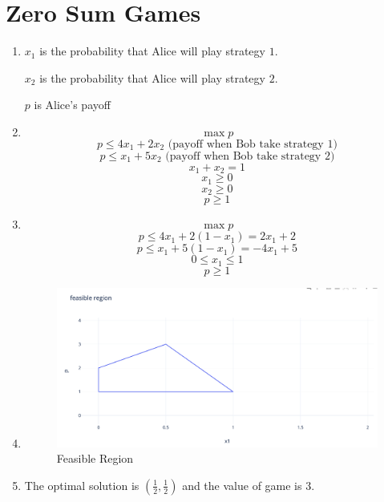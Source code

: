 \documentclass[11pt]{article}
\newenvironment{qparts}{\begin{enumerate}[{(}a{)}]}{\end{enumerate}}
\begin{document}
\newpage
\section{Zero Sum Games}
\begin{qparts}
	\item 
	
	$x_1$ is the probability that Alice will play strategy $1$. 
	
	$x_2$ is the probability that Alice will play strategy $2$.
	
	$p$ is Alice's payoff
	
	\item
	
	\[
		\max p
	\]
	\[
		p \le 4x_1 +2x_2 \text{ (payoff when Bob take strategy 1)}
	\]
	\[
		p \le x_1 +5x_2 \text{ (payoff when Bob take strategy 2)}
	\]
	\[
		x_1 + x_2 = 1
	\]
	\[
		x_1 \ge 0
	\]
	\[
		x_2 \ge 0
	\]
	\[
		p \ge 1
	\]
	
	\item
	
	\[
		\max p
	\]
	\[
		p \le 4x_1 +2(1 - x_1) = 2x_1 + 2
	\]
	\[
		p \le x_1 +5(1 - x_1) = -4x_1 + 5
	\]
	\[
		0 \le x_1 \le 1
	\]
	\[
		p \ge 1
	\]
	
	\item \text{ }
	
	\begin{figure}[h]
	\centering
	\includegraphics[width=.8\textwidth]{feasible_region.png}
	\caption{\label{fig:feasible_region}Feasible Region}
	\end{figure}
	
	\item
	
	The optimal solution is $(\frac{1}{2}, \frac{1}{2})$ and the value of game is 3.
	
\end{qparts}




\newpage
\end{document}
